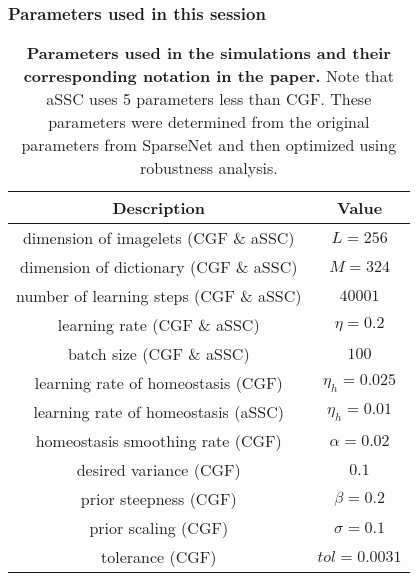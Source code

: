 \documentclass[a4]{beamer}%
\begin{document}
%
\begin{frame}
\frametitle{Parameters used in this session}%
{\tiny
\begin{table}%
\caption{\textbf{Parameters used in the simulations and their corresponding notation in the paper.} Note that aSSC uses 5 parameters less than CGF. These parameters were determined from the original parameters from {\sc SparseNet} and then optimized using robustness analysis.}
\begin{center}
\begin{tabular}{|c|c|} \hline%
Description&Value\\\hline\hline %
dimension of imagelets (CGF \& aSSC) & $L = 256$ \\ 
dimension of dictionary (CGF \& aSSC) & $M = 324$ \\ 
number of learning steps (CGF \& aSSC) & $40001$ \\ 
learning rate (CGF \& aSSC) & $\eta = 0.2$ \\ 
batch size (CGF \& aSSC) & $100$ \\ 
learning rate of homeostasis (CGF) & $\eta_h = 0.025$ \\ 
learning rate of homeostasis  (aSSC) & $\eta_h = 0.01$ \\ 
homeostasis smoothing rate (CGF) & $\alpha = 0.02$ \\ 
desired variance (CGF) & $0.1$ \\ 
prior steepness (CGF) & $\beta =0.2$ \\ 
prior scaling (CGF) & $\sigma = 0.1$ \\ 
tolerance (CGF) & $tol = 0.0031$ \\ 
\hline\hline%
\end{tabular}
\end{center}
\label{tab:comp}
\end{table}%
}
\end{frame}
\end{document}
